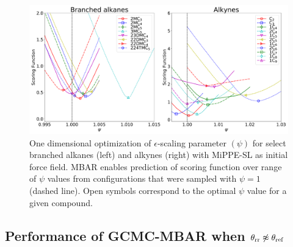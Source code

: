\documentclass[journal=jced,manuscript=article]{achemso}
\begin{document}

	\begin{figure}[htb!]
		\centering
		\includegraphics[width=6.4in]{Optimal_epsilon_scaling.pdf}
		\caption{One dimensional optimization of $\epsilon$-scaling parameter $(\psi)$ for select branched alkanes (left) and alkynes (right) with MiPPE-SL as initial force field. MBAR enables prediction of scoring function over range of $\psi$ values from configurations that were sampled with $\psi = 1$ (dashed line). Open symbols correspond to the optimal $\psi$ value for a given compound.}
		\label{fig:epsilon_scaling}
	\end{figure}

 

\subsection{Performance of GCMC-MBAR when $\theta_{\rm rr} \not\approx \theta_{\rm ref}$} \label{sec: litFF}
\end{document}
